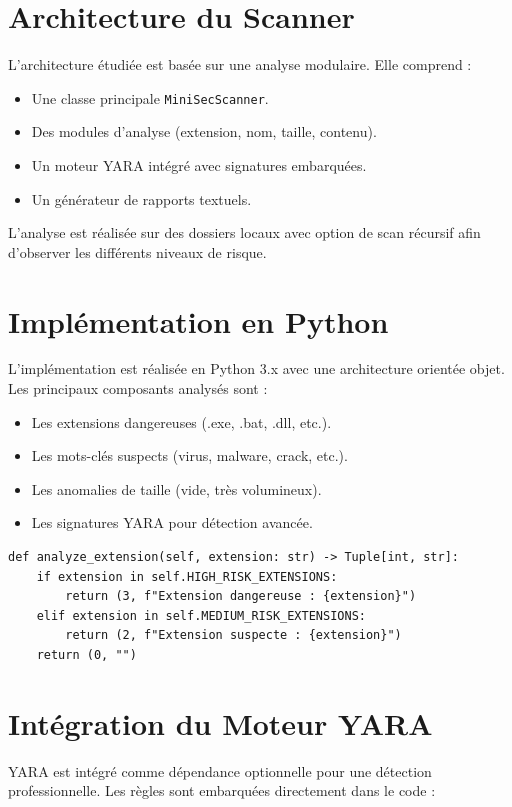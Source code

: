 \documentclass[a4paper,12pt]{article}
\begin{document}
\section{Architecture du Scanner}
L'architecture étudiée est basée sur une analyse modulaire.
Elle comprend :
\begin{itemize}
\item Une classe principale \texttt{MiniSecScanner}.
\item Des modules d'analyse (extension, nom, taille, contenu).
\item Un moteur YARA intégré avec signatures embarquées.
\item Un générateur de rapports textuels.
\end{itemize}

L'analyse est réalisée sur des dossiers locaux avec option de scan récursif
afin d'observer les différents niveaux de risque.

\section{Implémentation en Python}
L'implémentation est réalisée en Python 3.x avec une architecture orientée objet.
Les principaux composants analysés sont :
\begin{itemize}
\item Les extensions dangereuses (.exe, .bat, .dll, etc.).
\item Les mots-clés suspects (virus, malware, crack, etc.).
\item Les anomalies de taille (vide, très volumineux).
\item Les signatures YARA pour détection avancée.
\end{itemize}

\begin{lstlisting}[caption={Exemple d'analyse d'extension}]
def analyze_extension(self, extension: str) -> Tuple[int, str]:
    if extension in self.HIGH_RISK_EXTENSIONS:
        return (3, f"Extension dangereuse : {extension}")
    elif extension in self.MEDIUM_RISK_EXTENSIONS:
        return (2, f"Extension suspecte : {extension}")
    return (0, "")
\end{lstlisting}

\section{Intégration du Moteur YARA}
YARA est intégré comme dépendance optionnelle pour une détection professionnelle.
Les règles sont embarquées directement dans le code :
\end{document}
